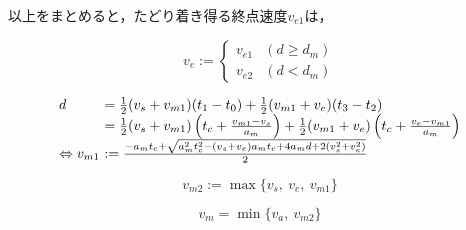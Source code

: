 \documentclass[a5paper]{ltjsarticle}
\begin{document}
以上をまとめると，たどり着き得る終点速度$v_{e1}$は，

$$
    v_{e} :=
    \left\{\begin{array}{ll}
        v_{e1} & (d        \ge d_m) \\
        v_{e2} & (d < d_m)
    \end{array}\right.
$$

$$
    \begin{array}{l@{~}l}
        d                      & =
        \frac{1}{2}(v_s+v_{m1})(t_1-t_0)+
        \frac{1}{2}(v_{m1}+v_e)(t_3-t_2)
        \\
                               & =
        \frac{1}{2}(v_s+v_{m1})\left(t_c+\frac{v_{m1}-v_s}{a_m}\right)+
        \frac{1}{2}(v_{m1}+v_e)\left(t_c+\frac{v_e-v_{m1}}{a_m}\right)
        \\
        \Leftrightarrow v_{m1} & := \frac{-a_mt_c + \sqrt{a_m^2t_c^2-(v_s+v_e)a_mt_c+4a_md+2(v_s^2+v_e^2)}}{2}
    \end{array}
$$

$$
    v_{m2} := \max\{v_s,~v_e,~v_{m1}\}
$$

$$
    v_m = \min\{v_a,~v_{m2}\}
$$
\end{document}
